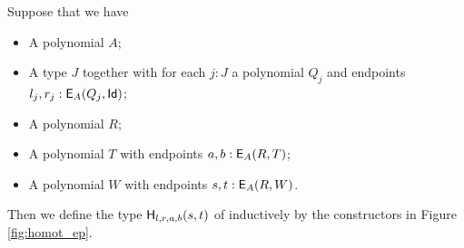 \begin{figure*}[t]
\vspace{5pt}

\begin{center}
\begin{bprooftree}
\end{bprooftree}
\end{center}

\vspace{5pt}

\begin{center}
\begin{bprooftree}
\end{bprooftree}
\begin{bprooftree}
\end{bprooftree}
\end{center}

\caption{Rules for the homotopy endpoints.}
\label{fig:homot_ep}
\end{figure*}

\begin{definition}
\label{def:homotep}
Suppose that we have
\begin{itemize}
	\item A polynomial $A$;
	\item A type $J$ together with for each $j : J$ a polynomial $Q_j$ and endpoints $l_j, r_j : \pathendpoint{A}{Q_j}{\idP}$;
	\item A polynomial $R$;
	\item A polynomial $T$ with endpoints $a, b : \pathendpoint{A}{R}{T}$;
	\item A polynomial $W$ with endpoints $s, t : \pathendpoint{A}{R}{W}$.
\end{itemize}
Then we define the type $\homotendpoint{l}{r}{a}{b}{s}{t}$ of  inductively by the constructors in Figure \ref{fig:homot_ep}.
\end{definition}

